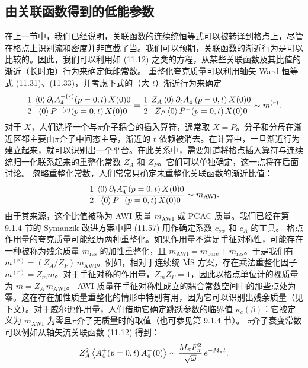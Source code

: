 \subsection{由关联函数得到的低能参数}
\label{sec:lowenergy}
在上一节中，我们已经说明，关联函数的连续统恒等式可以被转译到格点上，尽管在格点上识别流和密度并非直截了当。我们可以预期，关联函数的渐近行为是可以比较的。因此，我们可以利用如 (11.12) 之类的方程，从某些关联函数及其比值的渐近（长时距）行为来确定低能常数。
重整化夸克质量可以利用轴矢 Ward 恒等式 (11.31)、(11.33)，并考虑下式的（大 $t$）渐近行为来确定
\begin{equation}
\frac{1}{2}\,
\frac{\left\langle 0 \right\rangle{\partial_t A_4^{-(r)}(p = 0, t)\,X(0)}{0}}
{\left\langle 0 \right\rangle{P^{-(r)}(p = 0, t)\,X(0)}{0}}
= \frac{1}{2}\,
\frac{Z_A \left\langle 0 \right\rangle{\partial_t A_4^-(p = 0, t)\,X(0)}{0}}
{Z_P \left\langle 0 \right\rangle{P^-(p = 0, t)\,X(0)}{0}}
\sim m^{(r)} .
\end{equation}
对于 $X$，人们选择一个与$\pi$介子耦合的插入算符，通常取 $X = P$。分子和分母在渐近区都主要由$\pi$介子中间态主导，渐近的 $t$ 依赖被消去。在计算中，一旦渐近行为建立起来，就可以识别出一个平台。在此关系中，需要知道将格点插入算符与连续统归一化联系起来的重整化常数 $Z_A$ 和 $Z_P$。它们可以单独确定，这一点将在后面讨论。
忽略重整化常数，人们常常只确定未重整化关联函数的渐近比值：
\begin{equation}
\frac{1}{2}\,
\frac{\left\langle 0 \right\rangle{\partial_t A_4^-(p = 0, t)\,X(0)}{0}}
{\left\langle 0 \right\rangle{P^-(p = 0, t)\,X(0)}{0}}
\sim m_{\mathrm{AWI}} .
\end{equation}
由于其来源，这个比值被称为 AWI 质量 $m_{\mathrm{AWI}}$ 或 PCAC 质量。我们已经在第 9.1.4 节的 Symanzik 改进方案中把 (11.57) 用作确定系数 $c_{sw}$ 和 $c_A$ 的工具。
格点作用量的夸克质量可能经历两种重整化。如果作用量不满足手征对称性，可能存在一种被称为残余质量 $m_{\mathrm{res}}$ 的加性重整化，且 $m_{\mathrm{AWI}} = m_{\mathrm{bare}} + m_{\mathrm{res}}$。于是我们有 $m^{(r)} = (Z_A / Z_P)\, m_{\mathrm{AWI}}$。例如，相对于连续统 $\overline{\mathrm{MS}}$ 方案，存在乘法重整化因子 $m^{(r)} = Z_m m$。对于手征对称的作用量，$Z_m Z_P = 1$，因此以格点单位计的裸质量为 $m = Z_A\, m_{\mathrm{AWI}}$。
AWI 质量在手征对称性成立的耦合常数空间中的那些点处为零。这在存在加性质量重整化的情形中特别有用，因为它可以识别出残余质量（见下文）。对于威尔逊作用量，人们借助它确定跳跃参数的临界值 $\kappa_c(\beta)$：它被定义为 $m_{\mathrm{AWI}}$ 为零且$\pi$介子无质量时的取值（也可参见第 9.1.4 节）。
$\pi$介子衰变常数可以例如从轴矢流关联函数 (11.12) 得到：
\begin{equation}
Z_A^2 \left\langle A_4^+(p = 0, t)\, A_4^-(0) \right\rangle \sim \frac{M_\pi F_\pi^2}{\sqrt{\omega}}\, e^{-M_\pi t} .
\end{equation}
